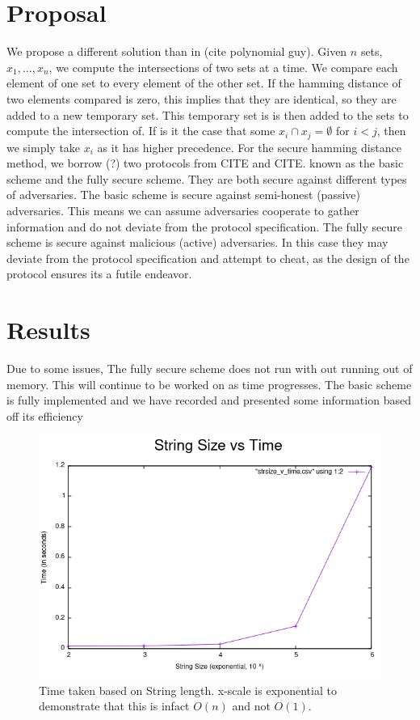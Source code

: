 \documentclass[10pt]{article}
\begin{document}
\section{Proposal}
We propose a different solution than in (cite polynomial guy). Given $n$ sets, $x_1,...,x_n$, we compute the intersections of two sets at a time. We compare each element of one set to every element of the other set. If the hamming distance of two elements compared is zero, this implies that they are identical, so they are added to a new temporary set. This temporary set is is then added to the sets to compute the intersection of. If is it the case that some $x_i \cap x_j = \emptyset$ for $i  < j$, then we simply take $x_i$ as it has higher precedence. For the secure hamming distance method, we borrow (?) two protocols from CITE and CITE. known as the basic scheme and the fully secure scheme. They are both secure against different types of adversaries. The basic scheme is secure against semi-honest (passive) adversaries. This means we can assume adversaries cooperate to gather information and do not deviate from the protocol specification. The fully secure scheme is secure against malicious (active) adversaries. In this case they may deviate from the protocol specification and attempt to cheat, as the design of the protocol ensures its a futile endeavor. 


\section{Results}
Due to some issues, The fully secure scheme does not run with out running out of memory. This will continue to be worked on as time progresses. The basic scheme is fully implemented and we have recorded and presented some information based off its efficiency

\begin{figure}[ht!]
\centering
\includegraphics[scale=0.64]{h1} 
\caption{Time taken based on String length. x-scale is exponential to demonstrate that this is infact $O(n)$ and not $O(1)$.}
\end{figure}
\end{document}
